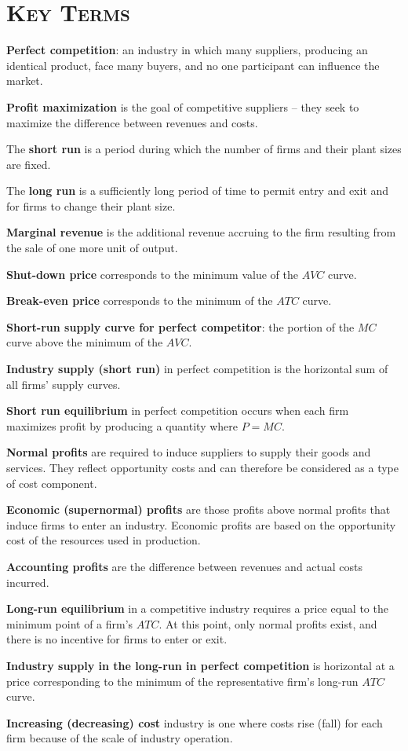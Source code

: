 \newpage
{}
	\section*{\textsc{Key Terms}}
\begin{keyterms}
\textbf{Perfect competition}: an industry in which many suppliers, producing an identical product, face many buyers, and no one participant can influence the market.

\textbf{Profit maximization} is the goal of competitive suppliers -- they seek to maximize the difference between revenues and costs.

The \textbf{short run} is a period during which the number of firms and their plant sizes are fixed.

The \textbf{long run} is a sufficiently long period of time to permit entry and exit and for firms to change their plant size.

\textbf{Marginal revenue} is the additional revenue accruing to the firm resulting from the sale of one more unit of output.

\textbf{Shut-down price} corresponds to the minimum value of the $AVC$ curve.

\textbf{Break-even price} corresponds to the minimum of the $ATC$ curve.

\textbf{Short-run supply curve for perfect competitor}: the portion of the $MC$ curve above the minimum of the $AVC$.

\textbf{Industry supply (short run)} in perfect competition is the horizontal sum of all firms' supply curves.

\textbf{Short run equilibrium} in perfect competition occurs when each firm maximizes profit by producing a quantity where $P=MC$.

\textbf{Normal profits} are required to induce suppliers to supply their goods and services. They reflect opportunity costs and can therefore be considered as a type of cost component.

\textbf{Economic (supernormal) profits} are those profits above normal profits that induce firms to enter an industry. Economic profits are based on the opportunity cost of the resources used in production.

\textbf{Accounting profits} are the difference between revenues and actual costs incurred.

\textbf{Long-run equilibrium} in a competitive industry requires a price equal to the minimum point of a firm's $ATC$. At this point, only normal profits exist, and there is no incentive for firms to enter or exit.

\textbf{Industry supply in the long-run in perfect competition} is horizontal at a price corresponding to the minimum of the representative firm's long-run $ATC$ curve.

\textbf{Increasing (decreasing) cost} industry is one where costs rise (fall) for each firm because of the scale of industry operation.
\end{keyterms}